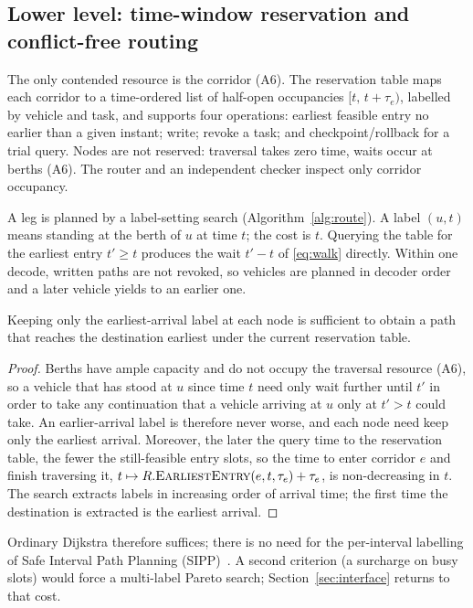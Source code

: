 \subsection{Lower level: time-window reservation and conflict-free routing}
\label{sec:router}

The only contended resource is the corridor (A6).
The reservation table maps each corridor to a time-ordered list of half-open occupancies $[t,\,t+\tau_e)$, labelled by vehicle and task, and supports four operations: earliest feasible entry no earlier than a given instant; write; revoke a task; and checkpoint/rollback for a trial query.
Nodes are not reserved: traversal takes zero time, waits occur at berths (A6).
The router and an independent checker inspect only corridor occupancy.

A leg is planned by a label-setting search (Algorithm~\ref{alg:route}).
A label $(u,t)$ means standing at the berth of $u$ at time $t$; the cost is $t$.
Querying the table for the earliest entry $t'\ge t$ produces the wait $t'-t$ of \eqref{eq:walk} directly.
Within one decode, written paths are not revoked, so vehicles are planned in decoder order and a later vehicle yields to an earlier one.

\begin{lem}
\label{lem:label}
Keeping only the earliest-arrival label at each node is sufficient to obtain a path that reaches the destination earliest under the current reservation table.
\end{lem}

\begin{proof}
  Berths have ample capacity and do not occupy the traversal resource (A6), so a vehicle that has stood at $u$ since time $t$ need only wait further until $t'$
  in order to take any continuation that a vehicle arriving at $u$ only at $t'>t$ could take.
  An earlier-arrival label is therefore never worse, and each node need keep only the earliest arrival.
  Moreover, the later the query time to the reservation table, the fewer the still-feasible entry slots,
  so the time to enter corridor $e$ and finish traversing it,
  $t\mapsto R.\textsc{EarliestEntry}(e,t,\tau_e)+\tau_e$,
  is non-decreasing in $t$.
  The search extracts labels in increasing order of arrival time; the first time the destination is extracted is the earliest arrival.
\end{proof}

Ordinary Dijkstra therefore suffices; there is no need for the per-interval labelling of Safe Interval Path Planning (SIPP)~\cite{kasaura2022sipp}.
A second criterion (a surcharge on busy slots) would force a multi-label Pareto search; Section~\ref{sec:interface} returns to that cost.

